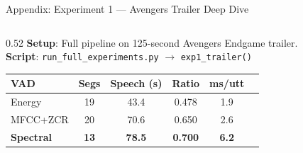 \documentclass[aspectratio=169]{beamer}
\begin{document}
\begin{frame}{Appendix: Experiment 1 — Avengers Trailer Deep Dive}
  \begin{columns}[T]
    \begin{column}{0.52\textwidth}
      \textbf{Setup}: Full pipeline on 125-second Avengers Endgame trailer.\\
      \textbf{Script}: \texttt{run\_full\_experiments.py} $\to$ \texttt{exp1\_trailer()}

      \vspace{0.3cm}
      \begin{center}
        \begin{tabular}{@{}lccccc@{}}
          \toprule
          \textbf{VAD} & \textbf{Segs} & \textbf{Speech (s)} & \textbf{Ratio} & \textbf{ms/utt} \\
          \midrule
          Energy & 19 & 43.4 & 0.478 & 1.9 \\
          MFCC+ZCR & 20 & 70.6 & 0.650 & 2.6 \\
          \textbf{Spectral} & \textbf{13} & \textbf{78.5} & \textbf{0.700} & \textbf{6.2} \\
          \bottomrule
        \end{tabular}
      \end{center}


\end{column}
\end{columns}
\end{frame}
\end{document}
